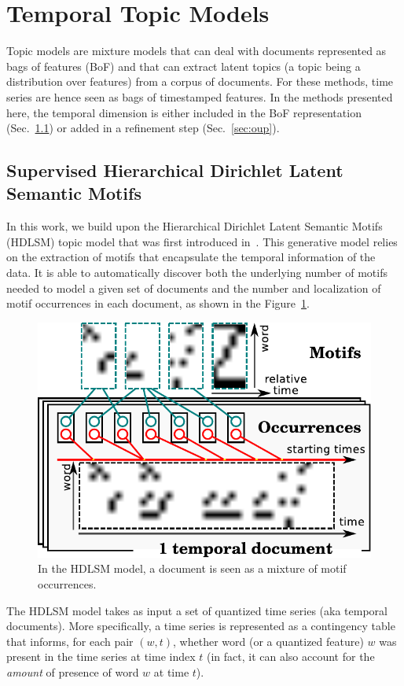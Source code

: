 \section{Temporal Topic Models}
\label{sec:topics}

Topic models are mixture models that can deal with documents represented as
bags of features (BoF) and that can extract latent topics (a topic being a
distribution
over features) from a corpus of documents.
For these methods, time series are hence seen as bags of timestamped features.
In the methods presented here, the temporal dimension is either
included in the BoF representation (Sec.~\ref{sec:hdlsm}) or added in a
refinement step (Sec.~\ref{sec:oup}).

\subsection{Supervised Hierarchical Dirichlet Latent Semantic Motifs}
\label{sec:hdlsm}

In this work, we build upon the Hierarchical Dirichlet Latent Semantic Motifs
(HDLSM) topic model that was first introduced in~\cite{EmonetCVPR2011}.
This generative model relies on the extraction of motifs that encapsulate the
temporal information of the data.
It is able to automatically discover both the underlying number of motifs
needed to
model a given set of documents and the number and localization of motif
occurrences in each document, as shown in the Figure~\ref{fig:hdlsm}.

\begin{figure}
\centering
\includegraphics[width=.4\textwidth]{fig/hdlsm}
\caption{In the HDLSM model, a document is seen as a mixture of motif
occurrences. \label{fig:hdlsm}}
\end{figure}

The HDLSM model takes as input a set of quantized time series (aka temporal
documents).
More specifically, a time series is represented as a contingency table that
informs, for
each pair $(w, t)$, whether word (or a quantized feature) $w$ was
present in the time series at time index $t$ (in fact, it can also account for
the \emph{amount} of presence of word $w$ at time $t$).

